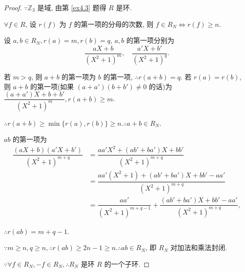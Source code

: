 \documentclass[color=black,device=normal,lang=cn,mode=geye]{elegantnote}
\begin{document}
\begin{proof}
    $\because\mathbb{Z}_3$ 是域, 由第 \ref{ex4.3} 题得 $R$ 是环.

    $\forall f\in R$, 设 $r(f)$ 为 $f$ 的第一项的分母的次数, 则 $f\in R_N\Leftrightarrow r(f)\geq n$.

    设 $a,b\in R_N,r(a)=m,r(b)=q$, $a,b$ 的第一项分别为
    \[\dfrac{aX+b}{(X^2+1)^m},\quad\dfrac{a'X+b'}{(X^2+1)^q}.\]

    若 $m>q$, 则 $a+b$ 的第一项为 $b$ 的第一项, $\therefore r(a+b)=q$. 若 $r(a)=r(b)$, 
    则 $a+b$ 的第一项(如果 $(a+a')(b+b')\neq0$ 的话)为 $\dfrac{(a+a')X+b+b'}{(X^2+1)^m},r(a+b)\geq m$.

    $\therefore r(a+b)\geq\min\{r(a),r(b)\}\geq n.\therefore a+b\in R_N$.

    $ab$ 的第一项为
    \begin{align*}
        \dfrac{(aX+b)(a'X+b')}{(X^2+1)^{m+q}} & =\dfrac{aa'X^2+(ab'+ba')X+bb'}{(X^2+1)^{m+q}} \\
        & =\dfrac{aa'(X^2+1)+(ab'+ba')X+bb'-aa'}{(X^2+1)^{m+q}} \\
        & =\dfrac{aa'}{(X^2+1)^{m+q-1}}+\dfrac{(ab'+ba')X+bb'-aa'}{(X^2+1)^{m+q}},
    \end{align*}

    $\therefore r(ab)=m+q-1$.

    $\because m\geq n,q\geq n,\therefore r(ab)\geq2n-1\geq n.\therefore ab\in R_N$, 即 $R_N$ 对加法和乘法封闭.

    $\because\forall f\in R_N,-f\in R_N,\therefore R_N$ 是环 $R$ 的一个子环.
\end{proof}
\end{document}
